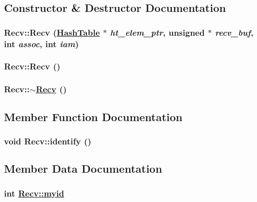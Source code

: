 \subsection{Constructor \& Destructor Documentation}
\hypertarget{classRecv_a1}{
\subsubsection[Recv]{\setlength{\rightskip}{0pt plus 5cm}Recv::Recv (\hyperlink{classHashTable}{Hash\-Table} $\ast$ {\em ht\_\-elem\_\-ptr}, unsigned $\ast$ {\em recv\_\-buf}, int {\em assoc}, int {\em iam})}}
\label{classRecv_a1}


\hypertarget{classRecv_a2}{
\subsubsection[Recv]{\setlength{\rightskip}{0pt plus 5cm}Recv::Recv ()}}
\label{classRecv_a2}


\hypertarget{classRecv_a3}{
\subsubsection[$\sim$Recv]{\setlength{\rightskip}{0pt plus 5cm}Recv::$\sim$\hyperlink{classRecv}{Recv} ()}}
\label{classRecv_a3}




\subsection{Member Function Documentation}
\hypertarget{classRecv_a0}{
\subsubsection[identify]{\setlength{\rightskip}{0pt plus 5cm}void Recv::identify ()}}
\label{classRecv_a0}




\subsection{Member Data Documentation}
\hypertarget{classRecv_o12}{
\subsubsection[myid]{\setlength{\rightskip}{0pt plus 5cm}int \hyperlink{classRecv_o12}{Recv::myid}}}
\label{classRecv_o12}


